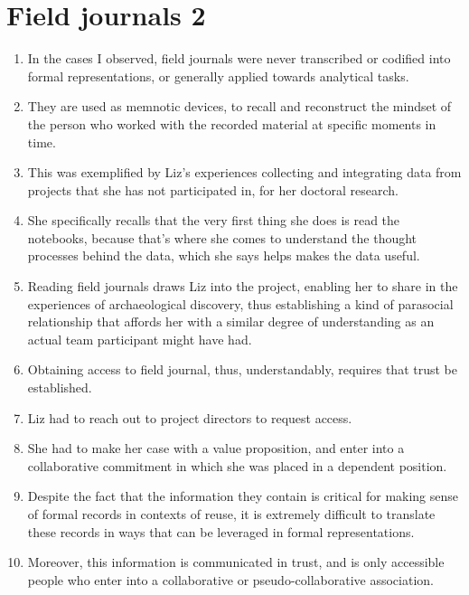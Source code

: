 \documentclass[12pt]{article}
\begin{document}
\section{Field journals 2}
\begin{enumerate}
  \item In the cases I observed, field journals were never transcribed or codified into formal representations, or generally applied towards analytical tasks.
  \item They are used as memnotic devices, to recall and reconstruct the mindset of the person who worked with the recorded material at specific moments in time.
  \item This was exemplified by Liz's experiences collecting and integrating data from projects that she has not participated in, for her doctoral research.
  \item She specifically recalls that the very first thing she does is read the notebooks, because that’s where she comes to understand the thought processes behind the data, which she says helps makes the data useful.
  \item Reading field journals draws Liz into the project, enabling her to share in the experiences of archaeological discovery, thus establishing a kind of parasocial relationship that affords her with a similar degree of understanding as an actual team participant might have had.
  \item Obtaining access to field journal, thus, understandably, requires that trust be established.
  \item Liz had to reach out to project directors to request access.
  \item She had to make her case with a value proposition, and enter into a collaborative commitment in which she was placed in a dependent position.
  \item Despite the fact that the information they contain is critical for making sense of formal records in contexts of reuse, it is extremely difficult to translate these records in ways that can be leveraged in formal representations.
  \item Moreover, this information is communicated in trust, and is only accessible people who enter into a collaborative or pseudo-collaborative association.
\end{enumerate}
\end{document}
